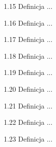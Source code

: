 \begin{enumerate}
    \item [1.15] Definicja ... %
    \item [1.16] Definicja ... %
    \item [1.17] Definicja ... %
    \item [1.18] Definicja ... %
    \item [1.19] Definicja ... %
    \item [1.20] Definicja ... %
    \item [1.21] Definicja ... %
    \item [1.22] Definicja ... %
    \item [1.23] Definicja ... %
\end{enumerate}	
	

